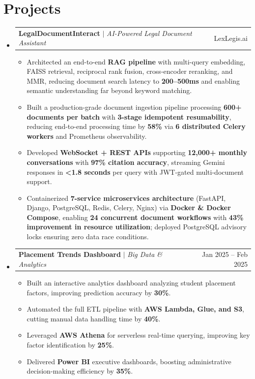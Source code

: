 \documentclass[letterpaper,11pt]{article}
\makeatletter
\newcommand{\resumeItem}[1]{
  \item\small{
    {#1 \vspace{-2pt}}
  }
}
\newcommand{\resumeProjectHeading}[2]{
    \item
    \begin{tabular*}{0.97\textwidth}{l@{\extracolsep{\fill}}r}
      \small#1 & #2 \\
    \end{tabular*}\vspace{-7pt}
}
\newcommand{\resumeSubHeadingListStart}{\begin{itemize}[leftmargin=0.15in, label={}]}
\newcommand{\resumeSubHeadingListEnd}{\end{itemize}}
\newcommand{\resumeItemListStart}{\begin{itemize}}
\newcommand{\resumeItemListEnd}{\end{itemize}\vspace{-5pt}}
\makeatother
\begin{document}
\section{Projects}
    \resumeSubHeadingListStart

      \resumeProjectHeading
          {\textbf{LegalDocumentInteract} $|$ \emph{AI-Powered Legal Document Assistant}}{LexLegis.ai}
          \resumeItemListStart
            \resumeItem{Architected an end-to-end \textbf{RAG pipeline} with multi-query embedding, FAISS retrieval, reciprocal rank fusion, cross-encoder reranking, and MMR, reducing document search latency to \textbf{200--500ms} and enabling semantic understanding far beyond keyword matching.}
            \resumeItem{Built a production-grade document ingestion pipeline processing \textbf{600+ documents per batch} with \textbf{3-stage idempotent resumability}, reducing end-to-end processing time by \textbf{58\%} via \textbf{6 distributed Celery workers} and Prometheus observability.}
            \resumeItem{Developed \textbf{WebSocket + REST APIs} supporting \textbf{12,000+ monthly conversations} with \textbf{97\% citation accuracy}, streaming Gemini responses in \textbf{<1.8 seconds} per query with JWT-gated multi-document support.}
            \resumeItem{Containerized \textbf{7-service microservices architecture} (FastAPI, Django, PostgreSQL, Redis, Celery, Nginx) via \textbf{Docker \& Docker Compose}, enabling \textbf{24 concurrent document workflows} with \textbf{43\% improvement in resource utilization}; deployed PostgreSQL advisory locks ensuring zero data race conditions.}
          \resumeItemListEnd

      \resumeProjectHeading
          {\textbf{Placement Trends Dashboard} $|$ \emph{Big Data \& Analytics}}{Jan 2025 -- Feb 2025}
          \resumeItemListStart
            \resumeItem{Built an interactive analytics dashboard analyzing student placement factors, improving prediction accuracy by \textbf{30\%}.}
            \resumeItem{Automated the full ETL pipeline with \textbf{AWS Lambda, Glue, and S3}, cutting manual data handling time by \textbf{40\%}.}
            \resumeItem{Leveraged \textbf{AWS Athena} for serverless real-time querying, improving key factor identification by \textbf{25\%}.}
            \resumeItem{Delivered \textbf{Power BI} executive dashboards, boosting administrative decision-making efficiency by \textbf{35\%}.}
          \resumeItemListEnd

    \resumeSubHeadingListEnd
\end{document}
